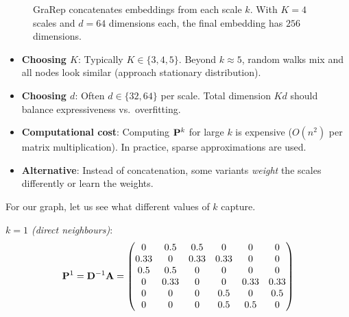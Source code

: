 \begin{notechapter}
\begin{figure}[htbp]
\caption{GraRep concatenates embeddings from each scale $k$. With $K=4$ scales and $d=64$ dimensions each, the final embedding has $256$ dimensions.}
\label{shallow-embeddings:fig:grarep_concat}
\end{figure}

\begin{remark}
\leavevmode
\begin{itemize}
    \item \textbf{Choosing $K$}: Typically $K \in \{3, 4, 5\}$. Beyond $k \approx 5$, random walks mix and all nodes look similar (approach stationary distribution).
    \item \textbf{Choosing $d$}: Often $d \in \{32, 64\}$ per scale. Total dimension $Kd$ should balance expressiveness vs.\ overfitting.
    \item \textbf{Computational cost}: Computing $\mathbf{P}^k$ for large $k$ is expensive ($O(n^2)$ per matrix multiplication). In practice, sparse approximations are used.
    \item \textbf{Alternative}: Instead of concatenation, some variants \emph{weight} the scales differently or learn the weights.
\end{itemize}
\end{remark}

\begin{example}
For our graph, let us see what different values of $k$ capture.

\emph{$k=1$ (direct neighbours)}:
\[
\mathbf{P}^1 = \mathbf{D}^{-1}\mathbf{A} = \begin{pmatrix}
0 & 0.5 & 0.5 & 0 & 0 & 0 \\
0.33 & 0 & 0.33 & 0.33 & 0 & 0 \\
0.5 & 0.5 & 0 & 0 & 0 & 0 \\
0 & 0.33 & 0 & 0 & 0.33 & 0.33 \\
0 & 0 & 0 & 0.5 & 0 & 0.5 \\
0 & 0 & 0 & 0.5 & 0.5 & 0
\end{pmatrix}
\]


\end{example}
\end{notechapter}
